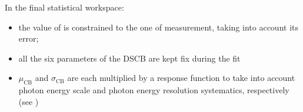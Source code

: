 In the final statistical workspace:
\begin{itemize}
	\item the value of \mH is constrained to the one of \RunOne measurement, taking into account its error;
	\item all the six parameters of the DSCB are kept fix during the fit
	\item $\mu_\text{CB}$ and $\sigma_\text{CB}$ are each multiplied by a response function to take into account photon energy scale and photon energy resolution systematics, respectively (see \Sect{\ref{sssec:signal_shape_syst}})
\end{itemize}

